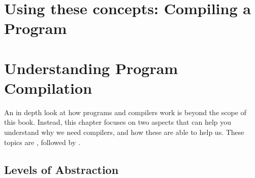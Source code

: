 



% 







\clearpage
\section{Using these concepts: Compiling a Program} %
\label{sec:using_these_concepts_compiling_a_program}













\clearpage
\def\pageLang{}
\section{Understanding Program Compilation} %
\label{sec:understanding_program_compilation}

An in depth look at how programs and compilers work is beyond the scope of this book. Instead, this chapter focuses on two aspects that can help you understand why we need compilers, and how these are able to help us. These topics are , followed by .

\subsection{Levels of Abstraction} %
\label{sub:levels_of_abstraction}

